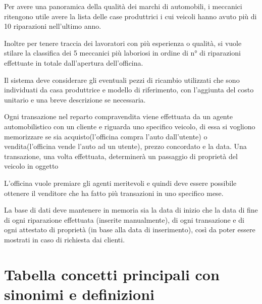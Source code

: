 \documentclass[a4paper,12pt]{report}
\begin{document}
Per avere una panoramica della qualità dei marchi di automobili, i meccanici ritengono utile avere la lista delle 
%
case produttrici i cui veicoli hanno avuto più di 10 riparazioni nell'ultimo anno.

Inoltre per tenere traccia dei lavoratori con più esperienza o qualità, si vuole stilare la classifica dei 5 meccanici
%
più laboriosi in ordine di n° di riparazioni effettuate in totale dall'apertura dell'officina.

Il sistema deve considerare gli eventuali pezzi di ricambio utilizzati che sono individuati da 
%
casa produttrice e modello di riferimento, con l'aggiunta del costo unitario e una breve descrizione se necessaria.

Ogni transazione nel reparto compravendita viene effettuata da un agente automobilistico con un cliente 
%
e riguarda uno specifico veicolo, di essa si vogliono memorizzare se sia acquisto(l'officina compra l'auto 
%
dall'utente) o vendita(l'officina vende l'auto ad un utente), prezzo concordato e la data. 
% 
Una transazione, una volta effettuata, determinerà un passaggio di proprietà del veicolo in oggetto

L'officina vuole premiare gli agenti meritevoli e quindi deve essere possibile ottenere il venditore che ha fatto
%
più transazioni in uno specifico mese. 

La base di dati deve mantenere in memoria sia la data di inizio che la data di fine di ogni riparazione effettuata
% 
(inserite manualmente), di ogni transazione e di ogni attestato di proprietà (in base alla data di inserimento),
%
così da poter essere mostrati in caso di richiesta dai clienti.

\section{Tabella concetti principali con sinonimi e definizioni}
\end{document}
